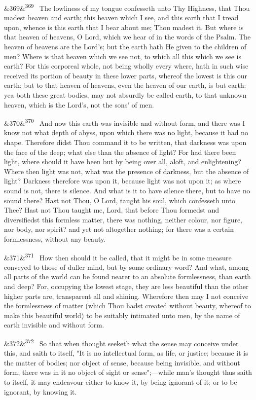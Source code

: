\documentclass[12pt]{article}
\newcommand{\para}[1][]{\par\noindent\ifx&#1&\else\textsuperscript{\footnotesize #1}~\fi}
\begin{document}
\para[369] The lowliness of my tongue confesseth unto Thy Highness, that Thou madest heaven and earth; this heaven which I see, and this earth that I tread upon, whence is this earth that I bear about me; Thou madest it. But where is that heaven of heavens, O Lord, which we hear of in the words of the Psalm. The heaven of heavens are the Lord's; but the earth hath He given to the children of men? Where is that heaven which we see not, to which all this which we see is earth? For this corporeal whole, not being wholly every where, hath in such wise received its portion of beauty in these lower parts, whereof the lowest is this our earth; but to that heaven of heavens, even the heaven of our earth, is but earth: yea both these great bodies, may not absurdly be called earth, to that unknown heaven, which is the Lord's, not the sons' of men.

\para[370] And now this earth was invisible and without form, and there was I know not what depth of abyss, upon which there was no light, because it had no shape. Therefore didst Thou command it to be written, that darkness was upon the face of the deep; what else than the absence of light? For had there been light, where should it have been but by being over all, aloft, and enlightening? Where then light was not, what was the presence of darkness, but the absence of light? Darkness therefore was upon it, because light was not upon it; as where sound is not, there is silence. And what is it to have silence there, but to have no sound there? Hast not Thou, O Lord, taught his soul, which confesseth unto Thee? Hast not Thou taught me, Lord, that before Thou formedst and diversifiedst this formless matter, there was nothing, neither colour, nor figure, nor body, nor spirit? and yet not altogether nothing; for there was a certain formlessness, without any beauty.

\para[371] How then should it be called, that it might be in some measure conveyed to those of duller mind, but by some ordinary word? And what, among all parts of the world can be found nearer to an absolute formlessness, than earth and deep? For, occupying the lowest stage, they are less beautiful than the other higher parts are, transparent all and shining. Wherefore then may I not conceive the formlessness of matter (which Thou hadst created without beauty, whereof to make this beautiful world) to be suitably intimated unto men, by the name of earth invisible and without form.

\para[372] So that when thought seeketh what the sense may conceive under this, and saith to itself, "It is no intellectual form, as life, or justice; because it is the matter of bodies; nor object of sense, because being invisible, and without form, there was in it no object of sight or sense";---while man's thought thus saith to itself, it may endeavour either to know it, by being ignorant of it; or to be ignorant, by knowing it.
\end{document}
